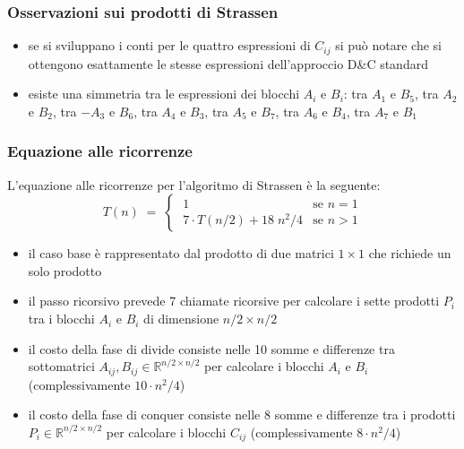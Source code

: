 \subsubsection*{Osservazioni sui prodotti di Strassen}
\begin{itemize}
	\item se si sviluppano i conti per le quattro espressioni di \(C_{ij}\) si può notare che si ottengono esattamente
	le stesse espressioni dell'approccio D\&C standard
	\item esiste una simmetria tra le espressioni dei blocchi \(A_i\) e \(B_i\): tra \(A_1\) e \(B_5\), tra \(A_2\)
	e \(B_2\), tra \(-A_3\) e \(B_6\), tra \(A_4\) e \(B_3\), tra \(A_5\) e \(B_7\), tra \(A_6\) e \(B_4\), tra \(A_7\) e \(B_1\)
\end{itemize}

\subsubsection*{Equazione alle ricorrenze}
L'equazione alle ricorrenze per l'algoritmo di Strassen è la seguente:
\[T(n) \; = \; \begin{cases}
	\; 1 & \text{se } n = 1 \\[3pt]
	\; 7 \cdot T(n/2) + 18 \; n^2/4 & \text{se } n > 1
\end{cases}\]

\begin{itemize}
	\item il caso base è rappresentato dal prodotto di due matrici \(1 \times 1\) che richiede un solo prodotto
	\item il passo ricorsivo prevede 7 chiamate ricorsive per calcolare i sette prodotti \(P_i\) tra i blocchi \(A_i\) e \(B_i\)
	di dimensione \(n/2 \times n/2\)
	\item il costo della fase di divide consiste nelle 10 somme e differenze tra sottomatrici \(A_{ij}, B_{ij} \in \mathbb{R}^{n/2 \times n/2}\)
	per calcolare i blocchi \(A_i\) e \(B_i\) (complessivamente \(10 \cdot n^2/4\))
	\item il costo della fase di conquer consiste nelle 8 somme e differenze tra i prodotti \(P_i \in \mathbb{R}^{n/2 \times n/2}\)
	per calcolare i blocchi \(C_{ij}\) (complessivamente \(8 \cdot n^2/4\))
\end{itemize}

